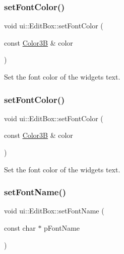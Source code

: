 \subsubsection{\texorpdfstring{set\+Font\+Color()}{setFontColor()}\hspace{0.1cm}{\footnotesize\ttfamily [1/2]}}
{\footnotesize\ttfamily void ui\+::\+Edit\+Box\+::set\+Font\+Color (\begin{DoxyParamCaption}\item[{const \hyperlink{structColor3B}{Color3B} \&}]{color }\end{DoxyParamCaption})}

Set the font color of the widget\textquotesingle{}s text. \mbox{\label{classui_1_1EditBox_a5dd7dcc5252cdb08ef9f0a15238df0dd}} 
\subsubsection{\texorpdfstring{set\+Font\+Color()}{setFontColor()}\hspace{0.1cm}{\footnotesize\ttfamily [2/2]}}
{\footnotesize\ttfamily void ui\+::\+Edit\+Box\+::set\+Font\+Color (\begin{DoxyParamCaption}\item[{const \hyperlink{structColor3B}{Color3B} \&}]{color }\end{DoxyParamCaption})}

Set the font color of the widget\textquotesingle{}s text. \mbox{\label{classui_1_1EditBox_a1070042cf20467ff429d93285a592204}} 
\subsubsection{\texorpdfstring{set\+Font\+Name()}{setFontName()}\hspace{0.1cm}{\footnotesize\ttfamily [1/2]}}
{\footnotesize\ttfamily void ui\+::\+Edit\+Box\+::set\+Font\+Name (\begin{DoxyParamCaption}\item[{const char $\ast$}]{p\+Font\+Name }\end{DoxyParamCaption})}

